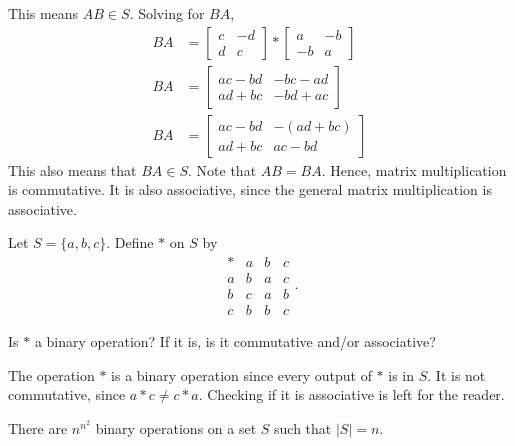 \begin{example}
        This means \(AB\in S\). Solving for \(BA\),
        \begin{align*}
            BA &= \begin{bmatrix} c & -d \\ d & c \end{bmatrix} *\begin{bmatrix} a & -b \\ -b & a \end{bmatrix} \\
            BA &= \begin{bmatrix}
                ac - bd & -bc - ad \\
                ad + bc & -bd + ac 
            \end{bmatrix} \\
            BA &= \begin{bmatrix}
                ac - bd & -(ad + bc) \\
                ad + bc & ac - bd
            \end{bmatrix}
        \end{align*}
        This also means that \(BA\in S\). Note that \(AB = BA\). Hence, matrix multiplication is commutative. It is also associative, since the general matrix multiplication is associative.
    \end{example}

    \begin{example}
        Let \(S = \{a, b, c\}\). Define \(*\) on \(S\) by
        \[
            \begin{array}{c|ccc}
                * & a & b & c \\ \hline
                a & b & a & c \\
                b & c & a & b \\
                c & b & b & c
            \end{array}.
        \]

        Is \(*\) a binary operation? If it is, is it commutative and/or associative?

        The operation \(*\) is a binary operation since every output of \(*\) is in \(S\). It is not commutative, since \(a*c \neq c*a\). Checking if it is associative is left for the reader. 
    \end{example}

    \begin{thm}
        There are \(n^{n^2}\) binary operations on a set \(S\) such that \(|S| = n\).
    \end{thm}

